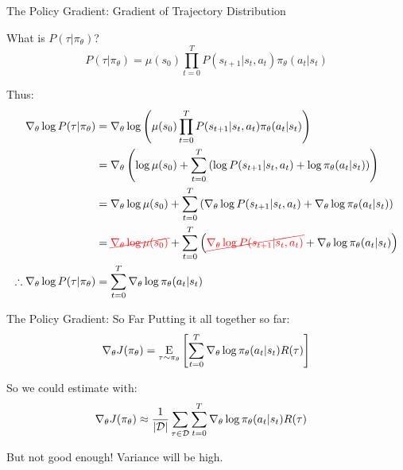 \documentclass[9pt]{beamer}
\newcommand{\underE}[2]{\underset{\begin{subarray}{c}#1 \end{subarray}}{\E}\left[ #2 \right]}
\begin{document}
\begin{frame}{The Policy Gradient: Gradient of Trajectory Distribution}

What is $P(\tau|\pi_{\theta})$?
%
\begin{equation*}
P(\tau | \pi_{\theta}) = \mu(s_0) \prod_{t=0}^T P(s_{t+1} | s_t, a_t) \pi_{\theta}(a_t |s_t)
\end{equation*}

Thus:
%
\begin{align*}
\nabla_{\theta} \log P(\tau|\pi_{\theta}) &= \nabla_{\theta} \log \left(\mu(s_0) \prod_{t=0}^T P(s_{t+1} | s_t, a_t) \pi_{\theta}(a_t |s_t)\right) \\
&= \nabla_{\theta} \left(\log \mu(s_0) + \sum_{t=0}^T \left(\log P(s_{t+1} | s_t, a_t) + \log \pi_{\theta}(a_t |s_t) \right)\right) \\
&= \nabla_{\theta} \log \mu(s_0) + \sum_{t=0}^T \left(\nabla_{\theta} \log P(s_{t+1} | s_t, a_t) + \nabla_{\theta} \log \pi_{\theta}(a_t |s_t) \right) \\
&= {\color{red}\cancel{\nabla_{\theta} \log \mu(s_0)}} + \sum_{t=0}^T \left({\color{red}\cancel{\nabla_{\theta} \log P(s_{t+1} | s_t, a_t)}} + \nabla_{\theta} \log \pi_{\theta}(a_t |s_t) \right) \\
\therefore \nabla_{\theta} \log P(\tau|\pi_{\theta}) &= \sum_{t=0}^T \nabla_{\theta} \log \pi_{\theta}(a_t | s_t)
\end{align*}

\end{frame}

\begin{frame}{The Policy Gradient: So Far}
Putting it all together so far:
%
\begin{equation*}
\nabla_{\theta} J(\pi_{\theta}) = \underE{\tau \sim \pi_{\theta}}{\sum_{t=0}^T \nabla_{\theta} \log \pi_{\theta}(a_t | s_t) R(\tau)}
\end{equation*}

So we could estimate with:
%
\begin{align*}
\nabla_{\theta} J(\pi_{\theta}) &\approx \frac{1}{|{\mathcal D}|} \sum_{\tau \in{\mathcal D}} \sum_{t=0}^T \nabla_{\theta} \log \pi_{\theta}(a_t | s_t) R(\tau)
\end{align*}

But not good enough! Variance will be high.

\end{frame}
\end{document}
